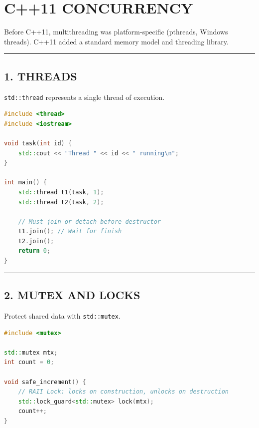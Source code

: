 \hypertarget{c11-concurrency}{%
\chapter{C++11 CONCURRENCY}\label{c11-concurrency}}

Before C++11, multithreading was platform-specific (pthreads, Windows
threads). C++11 added a standard memory model and threading library.

\begin{center}\rule{0.5\linewidth}{0.5pt}\end{center}

\hypertarget{threads}{%
\section{1. THREADS}\label{threads}}

\passthrough{\lstinline!std::thread!} represents a single thread of
execution.

\begin{lstlisting}[language={C++}]
#include <thread>
#include <iostream>

void task(int id) {
    std::cout << "Thread " << id << " running\n";
}

int main() {
    std::thread t1(task, 1);
    std::thread t2(task, 2);

    // Must join or detach before destructor
    t1.join(); // Wait for finish
    t2.join();
    return 0;
}
\end{lstlisting}

\begin{center}\rule{0.5\linewidth}{0.5pt}\end{center}

\hypertarget{mutex-and-locks}{%
\section{2. MUTEX AND LOCKS}\label{mutex-and-locks}}

Protect shared data with \passthrough{\lstinline!std::mutex!}.

\begin{lstlisting}[language={C++}]
#include <mutex>

std::mutex mtx;
int count = 0;

void safe_increment() {
    // RAII Lock: locks on construction, unlocks on destruction
    std::lock_guard<std::mutex> lock(mtx);
    count++;
}
\end{lstlisting}

